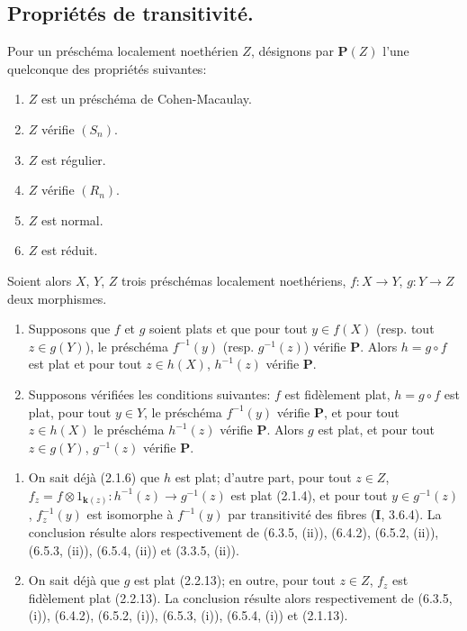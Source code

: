 
\subsection{Propriétés de transitivité.}

\begin{proposition}[6.6.1]
\label{IV.2.s6.6.1-fr}
Pour un préschéma localement noethérien $Z$, désignons par $\boldsymbol{P}(Z)$ l'une
quelconque des propriétés suivantes:
\begin{enumerate}
\item[\textup{a)}] $Z$ est un préschéma de Cohen-Macaulay.
\item[\textup{b)}] $Z$ vérifie $(S_n)$.
\item[\textup{c)}] $Z$ est régulier.
\item[\textup{d)}] $Z$ vérifie $(R_n)$.
\item[\textup{e)}] $Z$ est normal.
\item[\textup{f)}] $Z$ est réduit.
\end{enumerate}
Soient alors $X$, $Y$, $Z$ trois préschémas localement noethériens,
$f:X\to Y$, $g:Y\to Z$ deux morphismes.
\begin{enumerate}
\item[\textup{(i)}] Supposons que $f$ et $g$ soient plats et que pour tout
$y\in f(X)$ \textup{(resp.} tout $z\in g(Y)$), le préschéma $f^{-1}(y)$
\textup{(resp.} $g^{-1}(z)$) vérifie $\boldsymbol{P}$. Alors $h=g\circ f$ est plat et pour tout
$z\in h(X)$, $h^{-1}(z)$ vérifie $\boldsymbol{P}$.
\item[\textup{(ii)}] Supposons vérifiées les conditions suivantes: $f$ est
fidèlement plat, $h=g\circ f$ est plat, pour tout $y\in Y$, le
préschéma $f^{-1}(y)$ vérifie $\boldsymbol{P}$, et pour tout $z\in h(X)$ le
préschéma $h^{-1}(z)$ vérifie $\boldsymbol{P}$. Alors $g$ est plat, et pour tout
$z\in g(Y)$, $g^{-1}(z)$ vérifie $\boldsymbol{P}$.
\end{enumerate}
\end{proposition}

\begin{enumerate}
\item[(i)] On sait déjà (2.1.6) que $h$ est plat; d'autre part, pour
      tout $z\in Z$,
$f_z=f\otimes 1_{\mathbf{k}(z)}:h^{-1}(z)\longrightarrow g^{-1}(z)$ est plat (2.1.4), et pour tout $y\in g^{-1}(z)$, $f_z^{-1}(y)$ est
isomorphe à $f^{-1}(y)$ par transitivité des fibres (\textbf{I}, 3.6.4). La
conclusion résulte alors respectivement de (6.3.5, (ii)), (6.4.2),
(6.5.2, (ii)), (6.5.3, (ii)), (6.5.4, (ii)) et (3.3.5, (ii)).
\item[(ii)] On sait déjà que $g$ est plat (2.2.13); en outre, pour
      tout $z\in Z$, $f_z$ est fidèlement plat (2.2.13). La conclusion
      résulte alors respectivement de (6.3.5, (i)), (6.4.2),
(6.5.2, (i)), (6.5.3, (i)), (6.5.4, (i)) et (2.1.13).
\end{enumerate}


